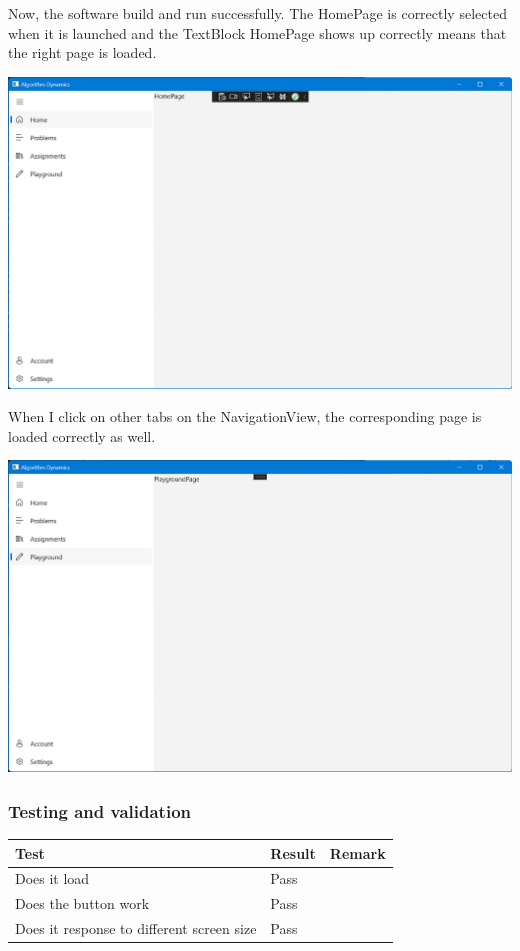 \documentclass[a4paper]{report}
\begin{document}
Now, the software build and run successfully. The HomePage is correctly selected when it is launched and the TextBlock HomePage shows up correctly means that the right page is loaded.

\includegraphics[width=\textwidth, height=\textheight, keepaspectratio]{HomePage-Draft-TextBlock}

When I click on other tabs on the NavigationView, the corresponding page is loaded correctly as well.

\includegraphics[width=\textwidth, height=\textheight, keepaspectratio]{PlaygroundPage-Draft-TextBlock}

\subsubsection{Testing and validation}

\begin{tabulary}{\linewidth}{|L|l|L|}
    \hline
    Test & Result & Remark \\
    \hline
    Does it load & Pass & \\
    \hline
    Does the button work & Pass & \\
    \hline
    Does it response to different screen size & Pass & \\
    \hline
\end{tabulary}
\end{document}
